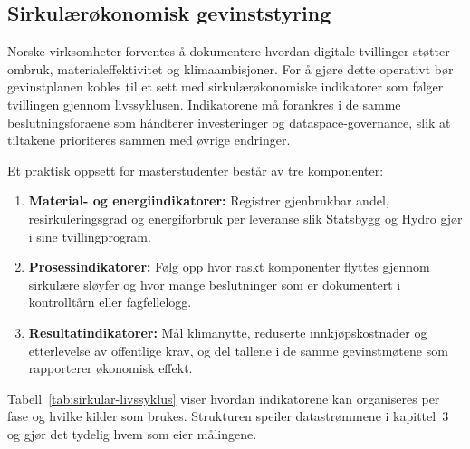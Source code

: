 \subsection*{Sirkulærøkonomisk gevinststyring}
Norske virksomheter forventes å dokumentere hvordan digitale tvillinger støtter ombruk, materialeffektivitet og klimaambisjoner.\citep{norskindustri2023sirkular,regjeringen2021sirkulaer} For å gjøre dette operativt bør gevinstplanen kobles til et sett med sirkulærøkonomiske indikatorer som følger tvillingen gjennom livssyklusen. Indikatorene må forankres i de samme beslutningsforaene som håndterer investeringer og dataspace-governance, slik at tiltakene prioriteres sammen med øvrige endringer.

Et praktisk oppsett for masterstudenter består av tre komponenter:
\begin{enumerate}
    \item \textbf{Material- og energiindikatorer:} Registrer gjenbrukbar andel, resirkuleringsgrad og energiforbruk per leveranse slik Statsbygg og Hydro gjør i sine tvillingprogram.\citep{statsbygg2022ombruk,hydro2023traceability}
    \item \textbf{Prosessindikatorer:} Følg opp hvor raskt komponenter flyttes gjennom sirkulære sløyfer og hvor mange beslutninger som er dokumentert i kontrolltårn eller fagfellelogg.
    \item \textbf{Resultatindikatorer:} Mål klimanytte, reduserte innkjøpskostnader og etterlevelse av offentlige krav, og del tallene i de samme gevinstmøtene som rapporterer økonomisk effekt.
\end{enumerate}

Tabell~\ref{tab:sirkular-livssyklus} viser hvordan indikatorene kan organiseres per fase og hvilke kilder som brukes. Strukturen speiler datastrømmene i kapittel~3 og gjør det tydelig hvem som eier målingene.

